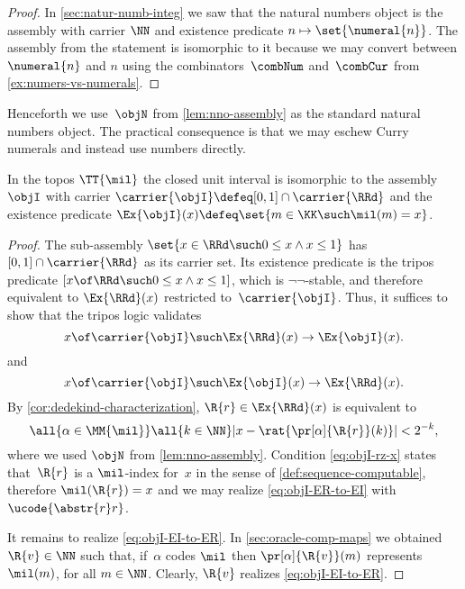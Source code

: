 \begin{proof}
  In \cref{sec:natur-numb-integ} we saw that the natural numbers object is the assembly with carrier
  $\NN$ and existence predicate $n \mapsto \set{\numeral{n}}$. The assembly from the statement is isomorphic
  to it because we may convert between $\numeral{n}$ and $n$ using the combinators~$\combNum$ and~$\combCur$ from \cref{ex:numers-vs-numerals}.
\end{proof}

Henceforth we use~$\objN$ from \cref{lem:nno-assembly} as the standard natural numbers object. The practical consequence is that we may eschew Curry numerals and instead use numbers directly.

\begin{lemma}
  \label{lem:interval-assembly}%
  In the topos $\TT{\mil}$ the closed unit interval is isomorphic to the assembly $\objI$ with carrier
  $\carrier{\objI} \defeq [0,1] \cap \carrier{\RRd}$ and the existence predicate
  $\Ex{\objI}(x) \defeq \set{m \in \KK \such \mil(m) = x}$.
\end{lemma}

\begin{proof}
  The sub-assembly $\set{x \in \RRd \such 0 \leq x \land x \leq 1}$ has $[0,1] \cap \carrier{\RRd}$ as its carrier set. Its existence predicate is the tripos predicate
  $[x \of \RRd \such 0 \leq x \land x \leq 1]$,
  which is $\neg\neg$-stable, and therefore equivalent to $\Ex{\RRd}(x)$ restricted to~$\carrier{\objI}$.
  Thus, it suffices to show that the tripos logic validates
  \begin{equation}
    \label{eq:objI-ER-to-EI}
    x \of \carrier{\objI} \such \Ex{\RRd}(x) \to \Ex{\objI}(x).
  \end{equation}
  and
  \begin{equation}
    \label{eq:objI-EI-to-ER}
    x \of \carrier{\objI} \such \Ex{\objI}(x) \to \Ex{\RRd}(x).
  \end{equation}
  By \cref{cor:dedekind-characterization}, $\R{r} \in \Ex{\RRd}(x)$ is equivalent to
  \begin{equation}
    \label{eq:objI-rz-x}
    \all{\alpha \in \MM{\mil}}
    \all{k \in \NN}
    |x - \rat{\pr[\alpha]{\R{r}}(k)}| < 2^{-k},
  \end{equation}
  where we used $\objN$ from \cref{lem:nno-assembly}.
  Condition \eqref{eq:objI-rz-x} states that~$\R{r}$ is a $\mil$-index for~$x$ in the sense of \cref{def:sequence-computable}, therefore $\mil(\R{r}) = x$ and we may realize \eqref{eq:objI-ER-to-EI} with $\ucode{\abstr{r} r}$.

  It remains to realize \eqref{eq:objI-EI-to-ER}.
  In \cref{sec:oracle-comp-maps} we obtained $\R{v} \in \NN$ such that, if~$\alpha$ codes $\mil$ then
  $\pr[\alpha]{\R{v}}(m)$ represents $\mil(m)$, for all $m \in \NN$.
  Clearly, $\R{v}$ realizes \eqref{eq:objI-EI-to-ER}.
\end{proof}

